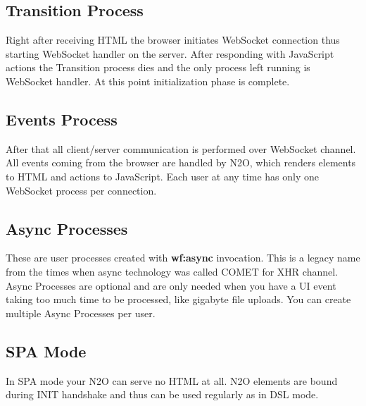 \subsection{Transition Process}
Right after receiving HTML the browser initiates WebSocket connection
thus starting WebSocket handler on the server. After responding with
JavaScript actions the Transition process dies and the only process left
running is WebSocket handler. At this point initialization phase is complete.

\subsection{Events Process}
After that all client/server communication is performed over
WebSocket channel. All events coming from the browser are
handled by N2O, which renders elements to HTML and actions to
JavaScript. Each user at any time has only one WebSocket process
per connection.

\subsection{Async Processes}
These are user processes created with {\bf wf:async} invocation.
This is a legacy name from the times when async technology
was called COMET for XHR channel. Async Processes are optional
and are only needed when you have a UI event taking too much
time to be processed, like gigabyte file uploads. You can create
multiple Async Processes per user.

\subsection{SPA Mode}
In SPA mode your N2O can serve no HTML at all. N2O elements are
bound during INIT handshake and thus can be used regularly as in DSL mode.


